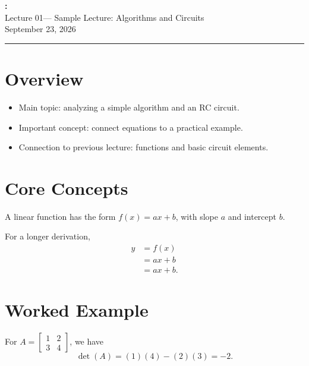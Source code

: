 \documentclass[../main.tex]{subfiles}
\begin{document}
\gdef\lecturenum{01}
\gdef\lecturetitle{Sample Lecture: Algorithms and Circuits}
\gdef\lecturedate{September 23, 2026}
\begin{center}{\Large\bfseries \coursename: \coursetitle}\\[3pt]
{\large Lecture \lecturenum --- \lecturetitle}\\[3pt]\lecturedate\end{center}
\vspace{.5em}\hrule\vspace{1em}
\section{Overview}
\begin{itemize}[leftmargin=*]\item Main topic: analyzing a simple algorithm and an RC circuit.
\item Important concept: connect equations to a practical example.
\item Connection to previous lecture: functions and basic circuit elements.\end{itemize}
\section{Core Concepts}
\begin{definitionbox}
A linear function has the form $f(x)=ax+b$, with slope $a$ and intercept $b$.
\end{definitionbox}
For a longer derivation,
\begin{align*}y&=f(x)\\&=ax+b\\&=\boxed{ax+b}.\end{align*}
\section{Worked Example}
\begin{examplebox}
For $A=\begin{bmatrix}1&2\\3&4\end{bmatrix}$, we have
\[\det(A)=(1)(4)-(2)(3)=\boxed{-2}.\]
\end{examplebox}
\end{document}
